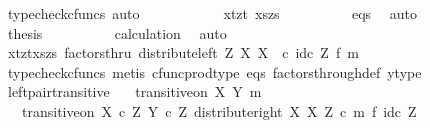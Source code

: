 \begin{isabellebody}
\ {\isacharparenleft}{\kern0pt}typecheck{\isacharunderscore}{\kern0pt}cfuncs{\isacharcomma}{\kern0pt}\ auto{\isacharparenright}{\kern0pt}\isanewline
\ \ \ \ \ \ \isamarkupfalse%
\ \isamarkupfalse%
\ {\isachardoublequoteopen}{\isachardot}{\kern0pt}{\isachardot}{\kern0pt}{\isachardot}{\kern0pt}\ {\isacharequal}{\kern0pt}\ {\isasymlangle}{\isasymlangle}xt{\isacharcomma}{\kern0pt}zt{\isasymrangle}{\isacharcomma}{\kern0pt}\ {\isasymlangle}xs{\isacharcomma}{\kern0pt}zs{\isasymrangle}{\isasymrangle}{\isachardoublequoteclose}\isanewline
\ \ \ \ \ \ \ \ \isamarkupfalse%
\ eqs\ \isamarkupfalse%
\ auto\isanewline
\ \ \ \ \ \ \isamarkupfalse%
\ \isamarkupfalse%
\ {\isacharquery}{\kern0pt}thesis\isanewline
\ \ \ \ \ \ \ \ \isamarkupfalse%
\ calculation\ \isamarkupfalse%
\ auto\isanewline
\ \ \ \ \isamarkupfalse%
\isanewline
\ \ \ \ \isamarkupfalse%
\ \isamarkupfalse%
\ {\isachardoublequoteopen}{\isasymlangle}{\isasymlangle}xt{\isacharcomma}{\kern0pt}zt{\isasymrangle}{\isacharcomma}{\kern0pt}{\isasymlangle}xs{\isacharcomma}{\kern0pt}zs{\isasymrangle}{\isasymrangle}\ factorsthru\ {\isacharparenleft}{\kern0pt}distribute{\isacharunderscore}{\kern0pt}left\ Z\ X\ X\ \ {\isasymcirc}\isactrlsub c\ {\isacharparenleft}{\kern0pt}id\isactrlsub c\ Z\ {\isasymtimes}\isactrlsub f\ m{\isacharparenright}{\kern0pt}{\isacharparenright}{\kern0pt}{\isachardoublequoteclose}\isanewline
\ \ \ \ \ \ \isamarkupfalse%
\ {\isacharparenleft}{\kern0pt}typecheck{\isacharunderscore}{\kern0pt}cfuncs{\isacharcomma}{\kern0pt}\ metis\ cfunc{\isacharunderscore}{\kern0pt}prod{\isacharunderscore}{\kern0pt}type\ eqs\ factors{\isacharunderscore}{\kern0pt}through{\isacharunderscore}{\kern0pt}def{}\ y{\isacharprime}{\kern0pt}{\isacharunderscore}{\kern0pt}type{\isacharparenright}{\kern0pt}\isanewline
\ \ \isamarkupfalse%
\isanewline
{}\isamarkupfalse%
%
\endisatagproof
{\isafoldproof}%
%
\isadelimproof
\isanewline
%
\endisadelimproof
\isanewline
{}\isamarkupfalse%
\ left{\isacharunderscore}{\kern0pt}pair{\isacharunderscore}{\kern0pt}transitive{\isacharcolon}{\kern0pt}\isanewline
\ \ \ {\isachardoublequoteopen}transitive{\isacharunderscore}{\kern0pt}on\ X\ {\isacharparenleft}{\kern0pt}Y{\isacharcomma}{\kern0pt}\ m{\isacharparenright}{\kern0pt}{\isachardoublequoteclose}\isanewline
\ \ \ {\isachardoublequoteopen}transitive{\isacharunderscore}{\kern0pt}on\ {\isacharparenleft}{\kern0pt}X\ {\isasymtimes}\isactrlsub c\ Z{\isacharparenright}{\kern0pt}\ {\isacharparenleft}{\kern0pt}Y\ {\isasymtimes}\isactrlsub c\ Z{\isacharcomma}{\kern0pt}\ distribute{\isacharunderscore}{\kern0pt}right\ X\ X\ Z\ {\isasymcirc}\isactrlsub c\ {\isacharparenleft}{\kern0pt}m\ {\isasymtimes}\isactrlsub f\ id\isactrlsub c\ Z{\isacharparenright}{\kern0pt}{\isacharparenright}{\kern0pt}{\isachardoublequoteclose}\isanewline

\end{isabellebody}
